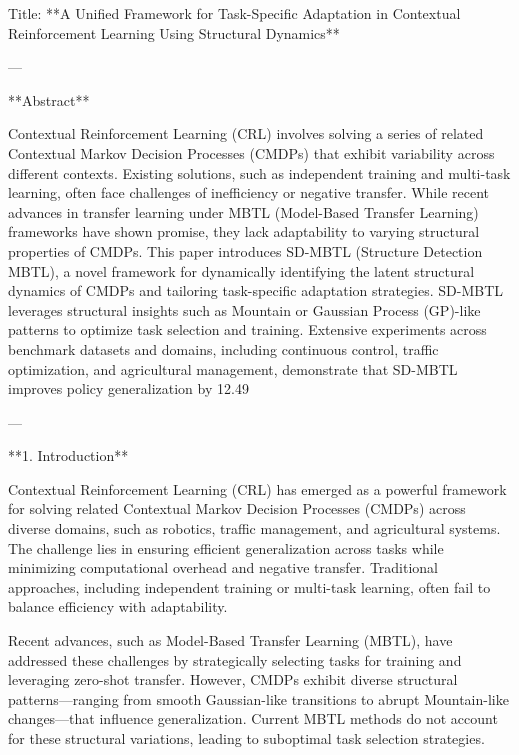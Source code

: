 Title: **A Unified Framework for Task-Specific Adaptation in Contextual Reinforcement Learning Using Structural Dynamics**

---

**Abstract**

Contextual Reinforcement Learning (CRL) involves solving a series of related Contextual Markov Decision Processes (CMDPs) that exhibit variability across different contexts. Existing solutions, such as independent training and multi-task learning, often face challenges of inefficiency or negative transfer. While recent advances in transfer learning under MBTL (Model-Based Transfer Learning) frameworks have shown promise, they lack adaptability to varying structural properties of CMDPs. This paper introduces SD-MBTL (Structure Detection MBTL), a novel framework for dynamically identifying the latent structural dynamics of CMDPs and tailoring task-specific adaptation strategies. SD-MBTL leverages structural insights such as Mountain or Gaussian Process (GP)-like patterns to optimize task selection and training. Extensive experiments across benchmark datasets and domains, including continuous control, traffic optimization, and agricultural management, demonstrate that SD-MBTL improves policy generalization by 12.49%

---

**1. Introduction**

Contextual Reinforcement Learning (CRL) has emerged as a powerful framework for solving related Contextual Markov Decision Processes (CMDPs) across diverse domains, such as robotics, traffic management, and agricultural systems. The challenge lies in ensuring efficient generalization across tasks while minimizing computational overhead and negative transfer. Traditional approaches, including independent training or multi-task learning, often fail to balance efficiency with adaptability.

Recent advances, such as Model-Based Transfer Learning (MBTL), have addressed these challenges by strategically selecting tasks for training and leveraging zero-shot transfer. However, CMDPs exhibit diverse structural patterns—ranging from smooth Gaussian-like transitions to abrupt Mountain-like changes—that influence generalization. Current MBTL methods do not account for these structural variations, leading to suboptimal task selection strategies.

